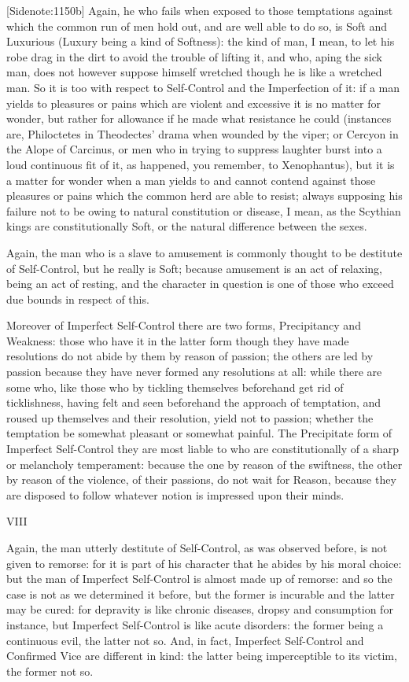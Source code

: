 [Sidenote:1150b] Again, he who fails when exposed to those temptations
against which the common run of men hold out, and are well able to do
so, is Soft and Luxurious (Luxury being a kind of Softness): the kind of
man, I mean, to let his robe drag in the dirt to avoid the trouble
of lifting it, and who, aping the sick man, does not however suppose
himself wretched though he is like a wretched man. So it is too with
respect to Self-Control and the Imperfection of it: if a man yields to
pleasures or pains which are violent and excessive it is no matter for
wonder, but rather for allowance if he made what resistance he could
(instances are, Philoctetes in Theodectes' drama when wounded by the
viper; or Cercyon in the Alope of Carcinus, or men who in trying to
suppress laughter burst into a loud continuous fit of it, as happened,
you remember, to Xenophantus), but it is a matter for wonder when a man
yields to and cannot contend against those pleasures or pains which the
common herd are able to resist; always supposing his failure not to be
owing to natural constitution or disease, I mean, as the Scythian kings
are constitutionally Soft, or the natural difference between the sexes.

Again, the man who is a slave to amusement is commonly thought to be
destitute of Self-Control, but he really is Soft; because amusement
is an act of relaxing, being an act of resting, and the character in
question is one of those who exceed due bounds in respect of this.

Moreover of Imperfect Self-Control there are two forms, Precipitancy and
Weakness: those who have it in the latter form though they have made
resolutions do not abide by them by reason of passion; the others are
led by passion because they have never formed any resolutions at
all: while there are some who, like those who by tickling themselves
beforehand get rid of ticklishness, having felt and seen beforehand the
approach of temptation, and roused up themselves and their resolution,
yield not to passion; whether the temptation be somewhat pleasant or
somewhat painful. The Precipitate form of Imperfect Self-Control they
are most liable to who are constitutionally of a sharp or melancholy
temperament: because the one by reason of the swiftness, the other by
reason of the violence, of their passions, do not wait for Reason,
because they are disposed to follow whatever notion is impressed upon
their minds.

VIII

Again, the man utterly destitute of Self-Control, as was observed
before, is not given to remorse: for it is part of his character that
he abides by his moral choice: but the man of Imperfect Self-Control is
almost made up of remorse: and so the case is not as we determined it
before, but the former is incurable and the latter may be cured: for
depravity is like chronic diseases, dropsy and consumption for instance,
but Imperfect Self-Control is like acute disorders: the former being a
continuous evil, the latter not so. And, in fact, Imperfect Self-Control
and Confirmed Vice are different in kind: the latter being imperceptible
to its victim, the former not so.

